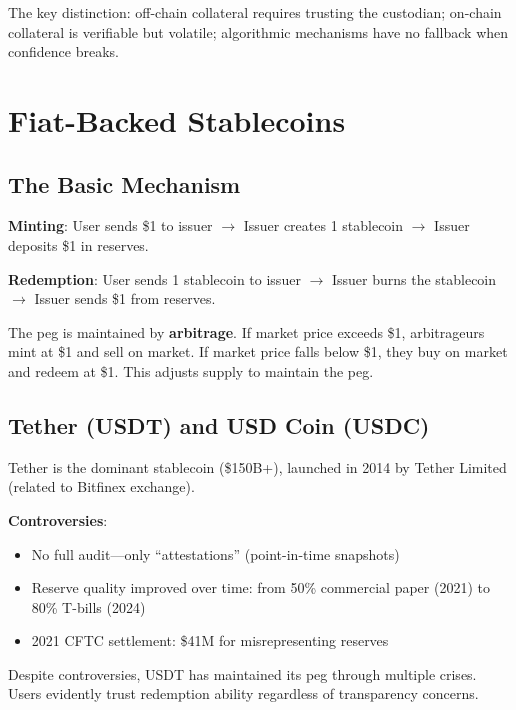 \documentclass[11pt,a4paper]{article}
\newcommand{\keyword}[1]{\textbf{\textcolor{AccentOrange}{#1}}}
\begin{document}
The key distinction: off-chain collateral requires trusting the custodian; on-chain collateral is verifiable but volatile; algorithmic mechanisms have no fallback when confidence breaks.

\section{Fiat-Backed Stablecoins}

\subsection{The Basic Mechanism}

\textbf{Minting}: User sends \$1 to issuer $\rightarrow$ Issuer creates 1 stablecoin $\rightarrow$ Issuer deposits \$1 in reserves.

\textbf{Redemption}: User sends 1 stablecoin to issuer $\rightarrow$ Issuer burns the stablecoin $\rightarrow$ Issuer sends \$1 from reserves.

The peg is maintained by \keyword{arbitrage}. If market price exceeds \$1, arbitrageurs mint at \$1 and sell on market. If market price falls below \$1, they buy on market and redeem at \$1. This adjusts supply to maintain the peg.

\subsection{Tether (USDT) and USD Coin (USDC)}

Tether is the dominant stablecoin (\$150B+), launched in 2014 by Tether Limited (related to Bitfinex exchange).

\textbf{Controversies}:
\begin{itemize}
    \item No full audit---only ``attestations'' (point-in-time snapshots)
    \item Reserve quality improved over time: from 50\% commercial paper (2021) to 80\% T-bills (2024)
    \item 2021 CFTC settlement: \$41M for misrepresenting reserves
\end{itemize}

Despite controversies, USDT has maintained its peg through multiple crises. Users evidently trust redemption ability regardless of transparency concerns.
\end{document}
